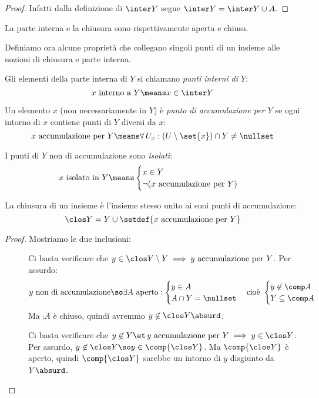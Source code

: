 \begin{proof}
	Infatti dalla definizione di $\inter Y$ segue $\inter Y=\inter Y\cup A$.
\end{proof}

\begin{oss}
	La parte interna e la chiusura sono rispettivamente aperta e chiusa.
\end{oss}

Definiamo ora alcune proprietà che collegano singoli punti di un insieme alle nozioni di chiusura e parte interna.

\begin{defn}
	Gli elementi della parte interna di $Y$ si chiamano \emph{punti interni di $Y$}:
	\[x\text{ interno a }Y\means x\in\inter Y\]
\end{defn}

\begin{defn}
	Un elemento $x$ (non necessariamente in $Y$) è \emph{punto di accumulazione per $Y$} se ogni intorno di $x$ contiene punti di $Y$ diversi da $x$:
	\[x\text{ accumulazione per }Y\means\forall\,U_x:(U\setminus\set{x})\cap Y\neq\nullset\]
\end{defn}

\begin{defn}
	I punti di $Y$ non di accumulazione sono \emph{isolati}:
	\[x\text{ isolato in }Y\means
	\begin{cases}
		x\in Y\\
		\neg(x\text{ accumulazione per }Y)
	\end{cases}\]
\end{defn}

\begin{lemma}
	\label{th:chiusuraacc}
	La chiusura di un insieme è l'insieme stesso unito ai suoi punti di accumulazione:
	\[\clos Y=Y\cup\setdef{x\text{ accumulazione per }Y}\]
\end{lemma}

\begin{proof}
	Mostriamo le due inclusioni:
	\begin{description}
		\item[\proofsubseteq]
		Ci basta verificare che $y\in\clos Y\setminus Y\implies y\text{ accumulazione per }Y$.
		Per assurdo:
		\[y\text{ non di accumulazione}\so
		\exists A\text{ aperto}:
		\begin{cases}
			y\in A\\
			A\cap Y=\nullset
		\end{cases}\text{cioè }
		\begin{cases}
			y\not\in\comp A\\
			Y\subseteq\comp A
		\end{cases}\]
		Ma $\comp A$ è chiuso, quindi avremmo $y\not\in\clos Y\absurd$.
		\item[\proofsupseteq]
		Ci basta verificare che $y\not\in Y\et\, y\text{ accumulazione per }Y\implies y\in\clos Y$.
		Per assurdo, $y\not\in\clos Y\so y\in\comp{\clos Y}$. Ma $\comp{\clos Y}$ è aperto, quindi $\comp{\clos Y}$ sarebbe un intorno di $y$ disgiunto da $Y\absurd$. \qedhere
	\end{description}
\end{proof}

